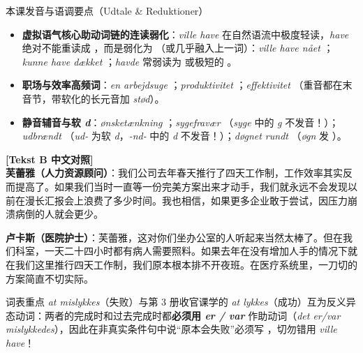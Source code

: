 \begin{tipbox}{本课发音与语调要点（Udtale \& Reduktioner）}
\begin{itemize}
  \item \textbf{虚拟语气核心助动词链的连读弱化}：\textit{ville have} 在自然语流中极度轻读，\textit{have} 绝对不能重读成 ，而是弱化为 （或几乎融入上一词）：\textit{ville have nået} ；\textit{kunne have dækket} ；\textit{havde} 常弱读为  或极短的 。
  \item \textbf{职场与效率高频词}：\textit{en arbejdsuge} ；\textit{produktivitet} ；\textit{effektivitet} （重音都在末音节，带软化的长元音加 \textit{stød}）。
  \item \textbf{静音辅音与软 \textit{d}}：\textit{ønsketænkning} ；\textit{sygefravær} （\textit{syge} 中的 \textit{g} 不发音！）；\textit{udbrændt} （\textit{ud-} 为软 \textit{d}，\textit{-nd-} 中的 \textit{d} 不发音！）；\textit{døgnet rundt} （\textit{øgn} 发 ）。
\end{itemize}
\end{tipbox}

\begin{transbox}
\small
\textbf{\color{NCDTeal}[Tekst B 中文对照]}\\
\textbf{芙蕾雅（人力资源顾问）}：我们公司去年春天推行了四天工作制，工作效率其实反而提高了。如果我们当时一直等一份完美方案出来才动手，我们就永远不会发现以前在漫长汇报会上浪费了多少时间。我也相信，如果更多企业敢于尝试，因压力崩溃病倒的人就会更少。

\textbf{卢卡斯（医院护士）}：芙蕾雅，这对你们坐办公室的人听起来当然太棒了。但在我们科室，一天二十四小时都有病人需要照料。如果去年在没有增加人手的情况下就在我们这里推行四天工作制，我们原本根本排不开夜班。在医疗系统里，一刀切的方案简直不切实际。
\end{transbox}


\begin{tipbox}{词表重点}
\textit{at mislykkes}（失败）与第 3 册收官课学的 \textit{at lykkes}（成功）互为反义异态动词：两者的完成时和过去完成时都\textbf{必须用 \textit{er / var}} 作助动词（\textit{det er/var mislykkedes}），因此在非真实条件句中说“原本会失败”必须写 ，切勿错用 \textit{ville have}！
\end{tipbox}


